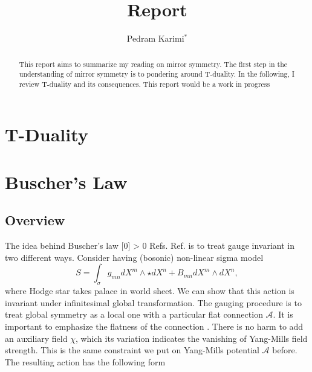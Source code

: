 \documentclass[a4paper]{article}
\title{\textbf{Report }}
\author{Pedram Karimi$^*$}
\date{}
\renewcommand{\cite}[1]{%
\begingroup
\def\tempx{0}%
  \StrCount{#1}{,}[\tempx]%
  \ifnum\tempx > 0 
  Refs. %
  \else
  Ref. %
  \fi
\endgroup
\origcite{#1}%
}
\begin{document}
\maketitle
\vspace{-18mm}


\section*{}

\begin{abstract}
{
This report aims to summarize my reading on mirror symmetry. The first step in the understanding of mirror symmetry is to pondering around T-duality. In the following, I review T-duality and its consequences. This report would be a work in progress
}
\end{abstract}




\section*{T-Duality}
\section{Buscher's Law}
\subsection{Overview}
The idea behind Buscher's law \cite{Buscher} is to treat gauge invariant in two different ways. Consider having (bosonic) non-linear sigma model 
\begin{equation}
S= \int_\sigma g_{m n} dX^m \wedge \star dX^n + B_{m n} dX^m \wedge dX^n,
\end{equation}
where Hodge star takes palace in world sheet. We can show that this action is invariant under infinitesimal global transformation. The gauging procedure is to treat global symmetry as a local one with a particular flat connection $\mathcal{A}$. It is important to emphasize the flatness of the connection . There is no harm to add an auxiliary field $\chi$, which its variation indicates the vanishing of Yang-Mills field strength. This is the same constraint we put on Yang-Mills potential $\mathcal{A}$ before. The resulting action has the following form
\end{document}
